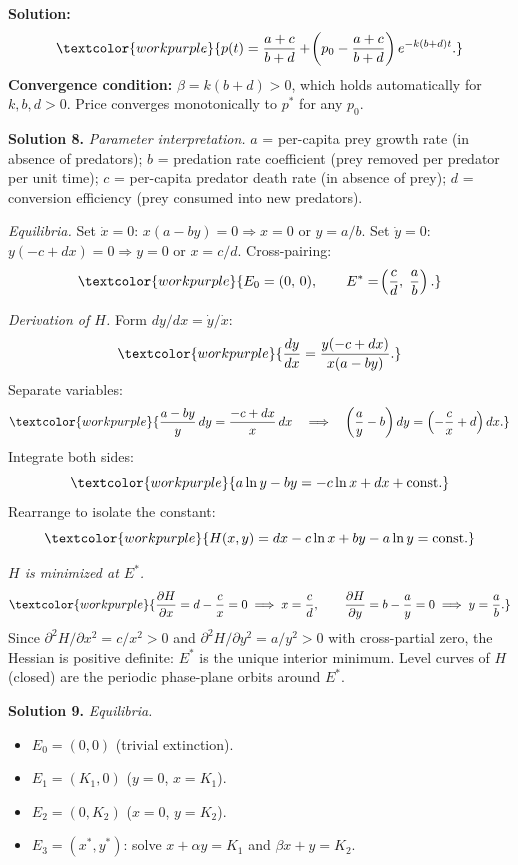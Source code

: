 \textbf{Solution:}
\[
  \textcolor{workpurple}{p(t) = \frac{a+c}{b+d}
  + \!\left(p_0 - \frac{a+c}{b+d}\right)e^{-k(b+d)t}.}
\]
\textbf{Convergence condition:} $\beta = k(b+d) > 0$, which holds automatically
for $k,b,d > 0$. Price converges monotonically to $p^*$ for any $p_0$.

\medskip

\noindent\textbf{Solution 8.}\quad
\textit{Parameter interpretation.}
$a$ = per-capita prey growth rate (in absence of predators);
$b$ = predation rate coefficient (prey removed per predator per unit time);
$c$ = per-capita predator death rate (in absence of prey);
$d$ = conversion efficiency (prey consumed into new predators).

\textit{Equilibria.}
Set $\dot{x} = 0$: $x(a - by) = 0 \Rightarrow x = 0$ or $y = a/b$.
Set $\dot{y} = 0$: $y(-c + dx) = 0 \Rightarrow y = 0$ or $x = c/d$.
Cross-pairing:
\[
  \textcolor{workpurple}{E_0 = (0,\,0), \qquad
  E^* = \!\left(\frac{c}{d},\;\frac{a}{b}\right).}
\]

\textit{Derivation of $H$.}
Form $dy/dx = \dot{y}/\dot{x}$:
\[
  \textcolor{workpurple}{\frac{dy}{dx}
  = \frac{y(-c + dx)}{x(a - by)}.}
\]
Separate variables:
\[
  \textcolor{workpurple}{\frac{a - by}{y}\,dy = \frac{-c + dx}{x}\,dx
  \quad\Longrightarrow\quad
  \left(\frac{a}{y} - b\right)dy = \left(-\frac{c}{x} + d\right)dx.}
\]
Integrate both sides:
\[
  \textcolor{workpurple}{a\ln y - by = -c\ln x + dx + \text{const}.}
\]
Rearrange to isolate the constant:
\[
  \textcolor{workpurple}{H(x,y) = dx - c\ln x + by - a\ln y = \text{const}.}
\]

\textit{$H$ is minimized at $E^*$.}
\[
  \textcolor{workpurple}{\frac{\partial H}{\partial x}
  = d - \frac{c}{x} = 0 \;\Longrightarrow\; x = \frac{c}{d},
  \qquad
  \frac{\partial H}{\partial y}
  = b - \frac{a}{y} = 0 \;\Longrightarrow\; y = \frac{a}{b}.}
\]
Since $\partial^2 H/\partial x^2 = c/x^2 > 0$ and
$\partial^2 H/\partial y^2 = a/y^2 > 0$ with cross-partial zero, the Hessian
is positive definite: $E^*$ is the unique interior minimum.
Level curves of $H$ (closed) are the periodic phase-plane orbits around $E^*$.

\medskip

\noindent\textbf{Solution 9.}\quad
\textit{Equilibria.}
\begin{itemize}[leftmargin=1.4em, itemsep=2pt]
  \item $E_0 = (0,0)$ (trivial extinction).
  \item $E_1 = (K_1, 0)$ ($y = 0$, $x = K_1$).
  \item $E_2 = (0, K_2)$ ($x = 0$, $y = K_2$).
  \item $E_3 = (x^*, y^*)$: solve $x + \alpha y = K_1$ and $\beta x + y = K_2$.
\end{itemize}

